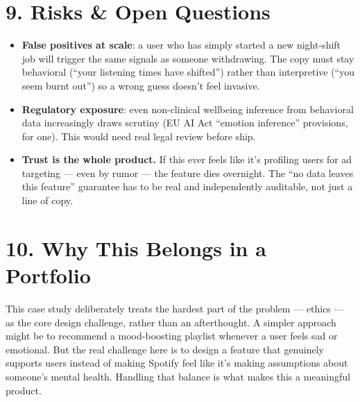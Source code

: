 \documentclass[11pt,a4paper]{article}
\begin{document}
\section*{9. Risks \& Open Questions}
\begin{itemize}[leftmargin=1.4em]
  \item \textbf{False positives at scale}: a user who has simply started a new night-shift job will trigger the same signals as someone withdrawing. The copy must stay behavioral (``your listening times have shifted'') rather than interpretive (``you seem burnt out'') so a wrong guess doesn't feel invasive.
  \item \textbf{Regulatory exposure}: even non-clinical wellbeing inference from behavioral data increasingly draws scrutiny (EU AI Act ``emotion inference'' provisions, for one). This would need real legal review before ship.
  \item \textbf{Trust is the whole product.} If this ever feels like it's profiling users for ad targeting --- even by rumor --- the feature dies overnight. The ``no data leaves this feature'' guarantee has to be real and independently auditable, not just a line of copy.
\end{itemize}

\section*{10. Why This Belongs in a Portfolio}
This case study deliberately treats the hardest part of the problem --- ethics --- as the core design challenge, rather than an afterthought. A simpler approach might be to recommend a mood-boosting playlist whenever a user feels sad or emotional. But the real challenge here is to design a feature that genuinely supports users instead of making Spotify feel like it's making assumptions about someone's mental health. Handling that balance is what makes this a meaningful product.
\end{document}
